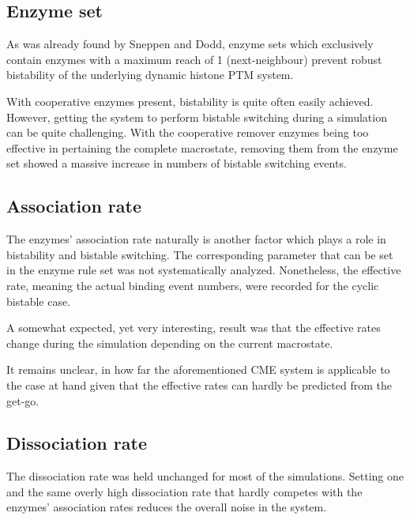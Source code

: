         \subsection*{Enzyme set}
            As was already found by Sneppen and Dodd, enzyme sets which exclusively contain enzymes with a maximum reach of 1 (next-neighbour) prevent robust bistability of the underlying dynamic histone PTM system.

            With cooperative enzymes present, bistability is quite often easily achieved. However, getting the system to perform bistable switching during a simulation can be quite challenging. With the cooperative remover enzymes being too effective in pertaining the complete macrostate, removing them from the enzyme set showed a massive increase in numbers of bistable switching events.
        \subsection*{Association rate}

            The enzymes' association rate naturally is another factor which plays a role in bistability and bistable switching. The corresponding parameter that can be set in the enzyme rule set was not systematically analyzed. Nonetheless, the effective rate, meaning the actual binding event numbers, were recorded for the cyclic bistable case.

            A somewhat expected, yet very interesting, result was that the effective rates change during the simulation depending on the current macrostate.

            It remains unclear, in how far the aforementioned CME system is applicable to the case at hand given that the effective rates can hardly be predicted from the get-go.

        \subsection*{Dissociation rate}

            The dissociation rate was held unchanged for most of the simulations. Setting one and the same overly high dissociation rate that hardly competes with the enzymes' association rates reduces the overall noise in the system.


